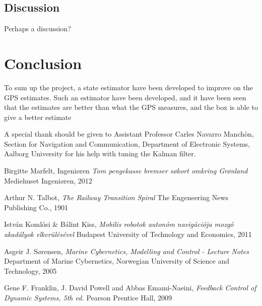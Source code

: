 \documentclass{ifacconf}
\begin{document}
\subsection{Discussion}
Perhaps a discussion?

\section{Conclusion}
To sum up the project, a state estimator have been developed to improve on the GPS estimates. Such an estimator have been developed, and it have been seen that the estimates are better than what the GPS measures, and the box is able to give a better estimate 

\begin{ack}                               %
A special thank should be given to Assistant Professor Carles Navarro Manchòn, Section for Navigation and Communication, Department of Electronic Systems, Aalborg University for his help with tuning the Kalman filter.  %
\end{ack}

%

\begin{thebibliography}{xx}

Birgitte Marfelt,
\newblock Ingeni\o ren
\newblock \emph{Tom pengekasse bremser søkort omkring Gr\o nland}
\newblock Mediehuset Ingeniøren, 2012

Arthur N. Talbot,
\newblock \emph{The Railway Transition Spiral}
\newblock The Engeneering News Publishing Co., 1901

Istv\'an Koml\'{o}si \& B\'alint Kiss, %
\newblock \emph{Mobilis robotok auton\'{o}m navig\'aci\'{o}ja mozg\'{o} akad\'alyok elker\"ul\'es\'evel} %
\newblock Budapest University of Technology and Economics, 2011 %

Asgeir J. S\o rensen,
\newblock \emph{Marine Cybernetics, Modelling and Control - Lecture Notes}
\newblock Department of Marine Cybernetics, Norwegian University of Science and Technology, 2005

Gene F. Franklin, J. David Powell and Abbas Emami-Naeini,
\newblock \emph{Feedback Control of Dynamic Systems, 5th ed.}
\newblock Pearson Prentice Hall, 2009

\end{thebibliography}
\end{document}
